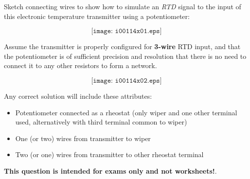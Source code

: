 

Sketch connecting wires to show how to simulate an {\it RTD} signal to the input of this electronic temperature transmitter using a potentiometer:

$$\texttt{[image: i00114x01.eps]}$$

Assume the transmitter is properly configured for {\bf 3-wire} RTD input, and that the potentiometer is of sufficient precision and resolution that there is no need to connect it to any other resistors to form a network.







$$\texttt{[image: i00114x02.eps]}$$

Any correct solution will include these attributes:

\begin{itemize}
\item{} Potentiometer connected as a rheostat (only wiper and one other terminal used, alternatively with third terminal common to wiper)
\item{} One (or two) wires from transmitter to wiper
\item{} Two (or one) wires from transmitter to other rheostat terminal
\end{itemize}







{\bf This question is intended for exams only and not worksheets!}.




